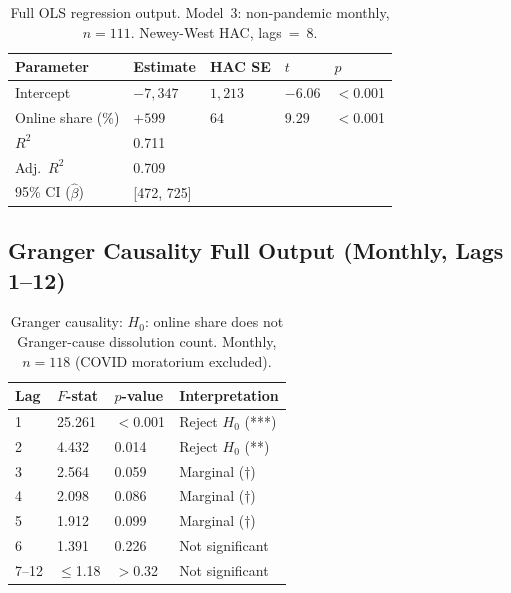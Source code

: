 \documentclass[12pt,a4paper]{article}
\begin{document}
\begin{table}[H]
\centering
\caption{Full OLS regression output. Model~3: non-pandemic monthly, $n=111$.
Newey-West HAC, lags~=~8.}
\small{}
\begin{tabular}{@{}L{3.5cm}R{2.0cm}R{2.0cm}R{1.8cm}R{2.0cm}@{}}
\toprule
{}\color{white}\textbf{Parameter} &
\color{white}\textbf{Estimate} & \color{white}\textbf{HAC SE} &
\color{white}\textbf{$t$} & \color{white}\textbf{$p$} \\
\midrule
Intercept & $-7{,}347$ & $1{,}213$ & $-6.06$ & $<$0.001 \\
Online share (\%) & $+599$ & $64$ & $9.29$ & $<$0.001 \\
$R^2$ & 0.711 & & & \\
Adj.\ $R^2$ & 0.709 & & & \\
95\% CI ($\hat\beta$) & [472, 725] & & & \\
\bottomrule
\end{tabular}
\end{table}

\subsection{Granger Causality Full Output (Monthly, Lags 1--12)}

\begin{table}[H]
\centering
\caption{Granger causality: $H_0$: online share does not Granger-cause dissolution count.
Monthly, $n=118$ (COVID moratorium excluded).}
\small{}
\begin{tabular}{@{}C{1.5cm}C{2.5cm}C{2.5cm}L{6.5cm}@{}}
\toprule
{}\color{white}\textbf{Lag} &
\color{white}\textbf{$F$-stat} & \color{white}\textbf{$p$-value} &
\color{white}\textbf{Interpretation} \\
 & 25.261 & $<$0.001 & Reject $H_0$ (***) \\
2 & 4.432 & 0.014 & Reject $H_0$ (**) \\
3 & 2.564 & 0.059 & Marginal ($\dagger$) \\
4 & 2.098 & 0.086 & Marginal ($\dagger$) \\
5 & 1.912 & 0.099 & Marginal ($\dagger$) \\
6 & 1.391 & 0.226 & Not significant \\
7--12 & $\leq$1.18 & $>$0.32 & Not significant \\
\bottomrule
\end{tabular}
\end{table}
\end{document}
